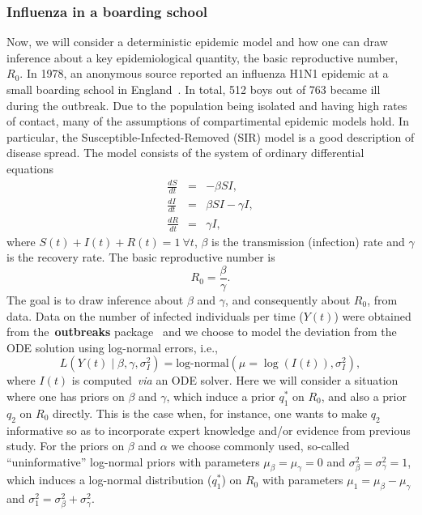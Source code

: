 \documentclass[a4paper, notitlepage, 10pt]{article}
\begin{document}
\subsubsection{Influenza in a boarding school}
\label{sec:SIR_flu}

Now, we will consider a deterministic epidemic model and how one can draw inference about a key epidemiological quantity, the basic reproductive number, $R_0$.
In 1978, an anonymous source reported an influenza H1N1 epidemic at a small boarding school in England~\citep{Anonymous1978}.
In total, 512 boys out of 763 became ill during the outbreak.
Due to the population being isolated and having high rates of contact, many of the assumptions of compartimental epidemic models hold.
In particular, the Susceptible-Infected-Removed (SIR) model is a good description of disease spread.
The model consists of the system of ordinary differential equations
\begin{eqnarray*}
\frac{dS}{dt}&=& - \beta SI,\\
\frac{dI}{dt}&=&  \beta SI - \gamma I,\\
\frac{dR}{dt}&=& \gamma I, 
\end{eqnarray*} 
where  $S(t) + I(t) + R(t) = 1 \: \forall t$, $\beta$ is the transmission (infection) rate and $\gamma$ is the recovery rate.
The basic reproductive number is 
\begin{equation}
\label{eq:r0def}
R_0 = \frac{\beta}{\gamma}. 
\end{equation}
The goal is to draw inference about $\beta$ and $\gamma$, and consequently about $R_0$, from data.
Data on the number of infected individuals per time ($Y(t)$) were obtained from the~\textbf{outbreaks} package~\citep{Outbreaks2019} and we choose to model the deviation from the ODE solution using log-normal errors, i.e.,
\begin{equation}
 \label{eq:log-normal_likelihood}
 L(Y(t)\mid \beta, \gamma, \sigma_I^2) = \text{log-normal}(\mu =  \log(I(t)), \sigma_I^2),
\end{equation}
where $I(t)$ is computed~\textit{via} an ODE solver.
Here we will consider a situation where one has priors on $\beta$ and $\gamma$, which induce a prior $q_1^\ast$ on $R_0$, and also a prior $q_2$ on $R_0$ directly.
This is the case when, for instance, one wants to make $q_2$ informative so as to incorporate expert knowledge and/or evidence from previous study.
For the priors on $\beta$ and $\alpha$ we choose commonly used, so-called ``uninformative'' log-normal priors with parameters $\mu_{\beta} = \mu_{\gamma} = 0$ and $\sigma_{\beta}^2 = \sigma_{\gamma}^2 = 1$, which induces a log-normal distribution ($q_1^\ast$) on $R_0$ with parameters $\mu_1 = \mu_\beta - \mu_\gamma$ and $\sigma_1^2 = \sigma_{\beta}^2 +  \sigma_{\gamma}^2$.
\end{document}
